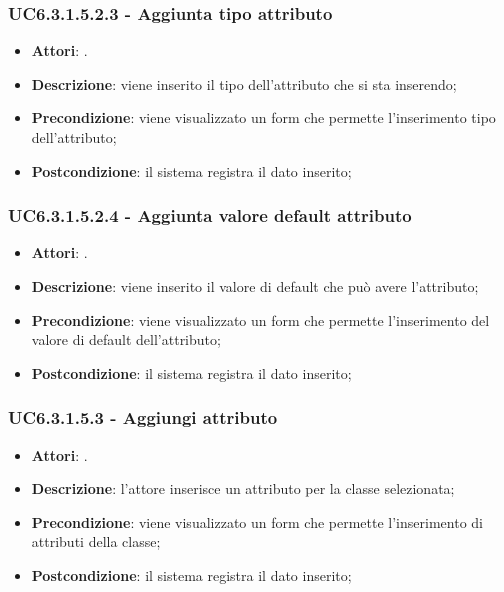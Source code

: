 \subsubsection{UC6.3.1.5.2.3 - Aggiunta tipo attributo} 
\label{sssec:UC6.3.1.5.2.3} 
\begin{itemize} 
\item \textbf{Attori}: .
\item \textbf{Descrizione}: viene inserito il tipo dell'attributo che si sta inserendo;
\item \textbf{Precondizione}: viene visualizzato un form che permette l'inserimento tipo dell'attributo;
\item \textbf{Postcondizione}: il sistema registra il dato inserito;
\end{itemize} 
\subsubsection{UC6.3.1.5.2.4 - Aggiunta valore default attributo} 
\label{sssec:UC6.3.1.5.2.4} 
\begin{itemize} 
\item \textbf{Attori}: .
\item \textbf{Descrizione}: viene inserito il valore di default che può avere l'attributo;
\item \textbf{Precondizione}: viene visualizzato un form che permette l'inserimento del valore di default dell'attributo;
\item \textbf{Postcondizione}: il sistema registra il dato inserito;
\end{itemize} 
\subsubsection{UC6.3.1.5.3 - Aggiungi attributo} 
\label{sssec:UC6.3.1.5.3} 
\begin{itemize} 
\item \textbf{Attori}: .
\item \textbf{Descrizione}: l'attore inserisce un attributo per la classe selezionata;
\item \textbf{Precondizione}: viene visualizzato un form che permette l'inserimento di attributi della classe;
\item \textbf{Postcondizione}: il sistema registra il dato inserito;
\end{itemize} 
